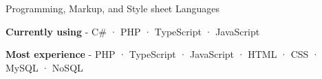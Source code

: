 

\begin{cventries}

  \cventry
    {Programming, Markup, and Style sheet} %
    {Languages} %
    {} %
    {} %
    {
      \begin{cvitems} %
        \item {\textbf{Currently using} \hspace{0.03cm} - \hspace{0.03cm}  C\# \hspace{0.03cm} · \hspace{0.03cm} PHP \hspace{0.03cm} · \hspace{0.03cm} TypeScript \hspace{0.03cm} · \hspace{0.03cm} JavaScript} %
        \item {\textbf{Most experience} \hspace{0.03cm} - \hspace{0.03cm} PHP \hspace{0.03cm} · \hspace{0.03cm} TypeScript \hspace{0.03cm} · \hspace{0.03cm} JavaScript \hspace{0.03cm} · \hspace{0.03cm} HTML \hspace{0.03cm} · \hspace{0.03cm} CSS \hspace{0.03cm} · \hspace{0.03cm} MySQL \hspace{0.03cm} · \hspace{0.03cm} NoSQL} %

\end{cvitems}}
\end{cventries}
